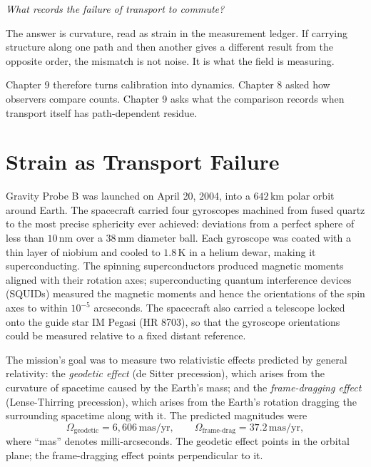 \begin{chapteressay}
\begin{center}
\emph{What records the failure of transport to commute?}
\end{center}

The answer is curvature, read as strain in the measurement ledger. If carrying
structure along one path and then another gives a different result from the
opposite order, the mismatch is not noise. It is what the field is measuring.

Chapter 9 therefore turns calibration into dynamics. Chapter 8 asked how
observers compare counts. Chapter 9 asks what the comparison records when
transport itself has path-dependent residue.

\end{chapteressay}


\section{Strain as Transport Failure}
\label{se:strain-as-transport-failure}

Gravity Probe B was launched on April 20, 2004, into a $642\,\mathrm{km}$
polar orbit around Earth. The spacecraft carried four gyroscopes machined
from fused quartz to the most precise sphericity ever achieved: deviations
from a perfect sphere of less than $10\,\mathrm{nm}$ over a $38\,\mathrm{mm}$
diameter ball. Each gyroscope was coated with a thin layer of niobium and
cooled to $1{.}8\,\mathrm{K}$ in a helium dewar, making it
superconducting. The spinning superconductors produced magnetic moments
aligned with their rotation axes; superconducting quantum interference
devices (SQUIDs) measured the magnetic moments and hence the orientations
of the spin axes to within $10^{-5}$ arcseconds. The spacecraft also
carried a telescope locked onto the guide star IM Pegasi (HR 8703), so
that the gyroscope orientations could be measured relative to a fixed
distant reference.

The mission's goal was to measure two relativistic effects predicted by
general relativity: the \emph{geodetic effect} (de Sitter precession),
which arises from the curvature of spacetime caused by the Earth's mass;
and the \emph{frame-dragging effect} (Lense-Thirring precession), which
arises from the Earth's rotation dragging the surrounding spacetime
along with it. The predicted magnitudes were
\[
\Omega_{\text{geodetic}} = 6{,}606 \,\mathrm{mas/yr}, \qquad
\Omega_{\text{frame-drag}} = 37{.}2 \,\mathrm{mas/yr},
\]
where ``mas'' denotes milli-arcseconds. The geodetic effect points in the
orbital plane; the frame-dragging effect points perpendicular to it.


